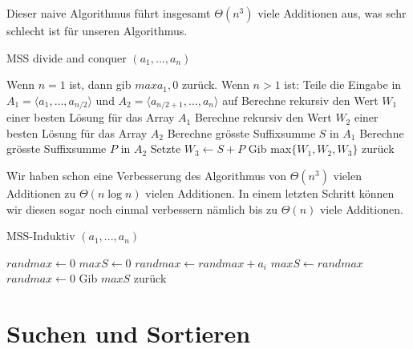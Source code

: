 \documentclass[a4paper]{article}
\begin{document}
Dieser naive Algorithmus führt insgesamt $\Theta(n^3)$ viele Additionen aus, was sehr schlecht ist für unseren Algorithmus.

\begin{algorithm}
 \caption{MSS divide and conquer $(a_1,..., a_n)$}
 \label{alg:MSS-Div}
 \begin{algorithmic}[1]
      \State Wenn $n=1$ ist, dann gib $max{a_1,0}$ zurück.
      \State Wenn $n>1$ ist:
      \State Teile die Eingabe in $A_1 = \langle a_1,...,a_{n/2} \rangle$ und $A_2 = \langle a_{n/2+1},...,a_{n} \rangle$ auf
      \State Berechne rekursiv den Wert $W_1$ einer besten Lösung für das Array $A_1$
      \State Berechne rekursiv den Wert $W_2$ einer besten Lösung für das Array $A_2$
      \State Berechne grösste Suffixsumme $S$ in $A_1$
      \State Berechne grösste Suffixsumme $P$ in $A_2$
      \State Setzte $W_3 \gets S+P$
      \State Gib max$\{W_1, W_2, W_3\}$ zurück
    \EndFunction
 \end{algorithmic}
\end{algorithm}

    Wir haben schon eine Verbesserung des Algorithmus von $\Theta(n^3)$ vielen Additionen zu $\Theta(n\log n)$ vielen Additionen. In einem letzten Schritt können wir diesen sogar noch einmal verbessern nämlich bis zu $\Theta(n)$ viele Additionen.

\begin{algorithm}
 \caption{MSS-Induktiv $(a_1,..., a_n)$}
 \label{alg:MSS-Induktiv}
    \begin{algorithmic}[1]
    \State $randmax \gets 0$
    \State $maxS \gets 0$
            \State $randmax \gets randmax + a_i$
                \State $maxS \gets randmax$
            \EndIf
                \State $randmax \gets 0$
            \EndIf
        \State Gib $maxS$ zurück
        \EndFor
    \EndFunction
    \end{algorithmic}
\end{algorithm}

\newpage
\section{Suchen und Sortieren}
\end{document}
